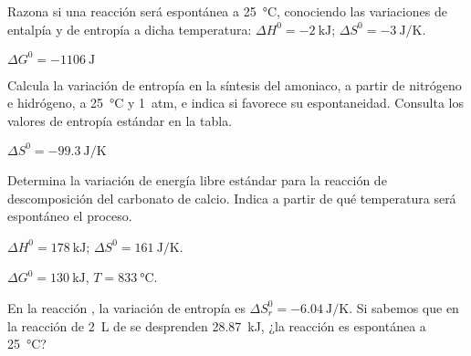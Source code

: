   \begin{exercise}[
      tags    = {termodinámica, espontaneidad, Gibbs},
      topics  = {química, termoquímica, termodinámica},
      source  = {},
    ]
    Razona si una reacción será espontánea a \SI{25}{\celsius}, conociendo las variaciones de entalpía y de entropía a dicha temperatura: \( \Delta H^0 = \SI{-2}{\kilo\joule} \); \( \Delta S^0 = \SI{-3}{\joule\per\kelvin} \).
  \end{exercise}

  \begin{solution}
    \( \Delta G^0 = \SI{-1106}{\joule} \)
  \end{solution}




  \begin{exercise}[
      tags    = {termodinámica, espontaneidad},
      topics  = {química, termoquímica, termodinámica},
      source  = {},
    ]
    Calcula la variación de entropía en la síntesis del amoniaco, a partir de nitrógeno e hidrógeno, a \SI{25}{\celsius} y \SI{1}{atm}, e indica si favorece su espontaneidad. Consulta los valores de entropía estándar en la tabla.
  \end{exercise}

  \begin{solution}
    \( \Delta S^0 = \SI{-99.3}{\joule\per\kelvin} \)
  \end{solution}




  \begin{exercise}[
      tags    = {termodinámica, espontaneidad, Gibbs},
      topics  = {química, termoquímica, termodinámica},
      source  = {},
    ]
    Determina la variación de energía libre estándar para la reacción de descomposición del carbonato de calcio. Indica a partir de qué temperatura será espontáneo el proceso.

    \begin{gexdatos}
      \( \Delta H^0 = \SI{178}{\kilo\joule} \); \( \Delta S^0 = \SI{161}{\joule\per\kelvin} \).
    \end{gexdatos}
  \end{exercise}

  \begin{solution}
    \( \Delta G^0 = \SI{130}{\kilo\joule} \), \( T = \SI{833}{\celsius} \).
  \end{solution}




  \begin{exercise}[
      tags    = {termodinámica, espontaneidad, Gibbs},
      topics  = {química, termoquímica, termodinámica},
      source  = {},
    ]
    En la reacción , la variación de entropía es \( \Delta S^0_r = \SI{-6.04}{\joule\per\kelvin} \). Si sabemos que en la reacción de \SI{2}{\liter} de  se desprenden \SI{28.87}{\kilo\joule}, ¿la reacción es espontánea a \SI{25}{\celsius}?
  \end{exercise}

